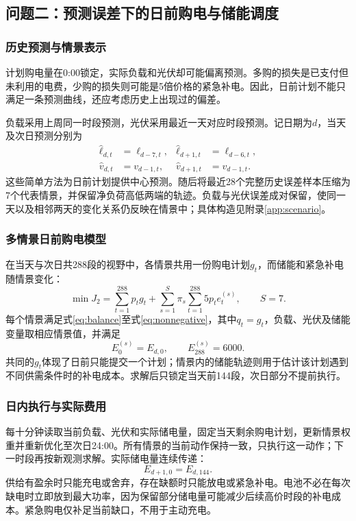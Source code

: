 \subsection{问题二：预测误差下的日前购电与储能调度}
\subsubsection{历史预测与情景表示}
计划购电量在0:00锁定，实际负载和光伏却可能偏离预测。多购的损失是已支付但未利用的电费，少购的损失则可能是5倍价格的紧急补电。因此，日前计划不能只满足一条预测曲线，还应考虑历史上出现过的偏差。

负载采用上周同一时段预测，光伏采用最近一天对应时段预测。记日期为$d$，当天及次日预测分别为
\begin{align}
\widehat\ell_{d,t}&=\ell_{d-7,t},&\widehat\ell_{d+1,t}&=\ell_{d-6,t},\\
\widehat v_{d,t}&=v_{d-1,t},&\widehat v_{d+1,t}&=v_{d-1,t}.
\end{align}
这些简单方法为日前计划提供中心预测。随后将最近28个完整历史误差样本压缩为7个代表情景，并保留净负荷高低两端的轨迹。负载与光伏误差成对保留，使同一天以及相邻两天的变化关系仍反映在情景中；具体构造见附录\ref{app:scenario}。

\subsubsection{多情景日前购电模型}
在当天与次日共288段的视野中，各情景共用一份购电计划$g_t$，而储能和紧急补电随情景变化：
\begin{equation}
\min J_2=\sum_{t=1}^{288}p_tg_t+
\sum_{s=1}^{S}\pi_s\sum_{t=1}^{288}5p_te_t^{(s)},\qquad S=7.
\label{eq:q2objective}
\end{equation}
每个情景满足式\eqref{eq:balance}至式\eqref{eq:nonnegative}，其中$q_t=g_t$，负载、光伏及储能变量取相应情景值，并满足
\begin{equation}
E_0^{(s)}=E_{d,0},\qquad E_{288}^{(s)}=6000.
\end{equation}
共同的$g_t$体现了日前只能提交一个计划；情景内的储能轨迹则用于估计该计划遇到不同供需条件时的补电成本。求解后只锁定当天前144段，次日部分不提前执行。

\subsubsection{日内执行与实际费用}
每十分钟读取当前负载、光伏和实际储电量，固定当天剩余购电计划，更新情景权重并重新优化至次日24:00。所有情景的当前动作保持一致，只执行这一动作；下一时段再按新观测求解。实际储电量连续传递：
\begin{equation}E_{d+1,0}=E_{d,144}.\end{equation}
供给有盈余时只能充电或舍弃，存在缺额时只能放电或紧急补电。电池不必在每次缺电时立即放到最大功率，因为保留部分储电量可能减少后续高价时段的补电成本。紧急购电仅补足当前缺口，不用于主动充电。

